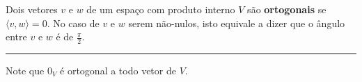 \begin{definition}
	Dois vetores $v$ e $w$ de um espaço com produto interno $V$ são \textbf{ortogonais} se $\langle v,w\rangle=0$. No caso de $v$ e $w$ serem não-nulos, isto equivale a dizer que o ângulo entre $v$ e $w$ é de $\frac{\pi}{2}$.
	
	\hrule
	
	Note que $0_V$ é ortogonal a todo vetor de $V$.
\end{definition}